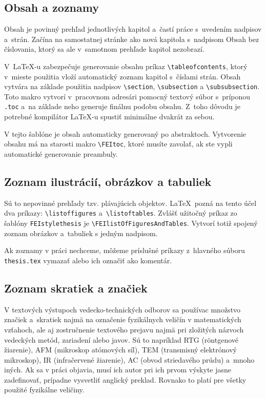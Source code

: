 \subsection{Obsah a zoznamy}
Obsah je povinný prehľad jednotlivých kapitol
a~častí práce s~uvedením nadpisov a~strán.
Začína na samostatnej stránke ako nová kapitola
s~nadpisom Obsah bez číslovania,
ktorý sa ale v~samotnom prehľade kapitol nezobrazí.

V~\LaTeX-u zabezpečuje generovanie obsahu príkaz \verb|\tableofcontents|,
ktorý v~mieste použitia vloží automatický zoznam kapitol s~číslami strán.
Obsah vytvára na základe použitia nadpisov \verb|\section|,
\verb|\subsection| a \verb|\subsubsection|.
Toto makro vytvorí v~pracovnom adresári pomocný textový súbor
s~príponou \verb|.toc| a~na základe neho generuje finálnu podobu obsahu.
Z~toho dôvodu je potrebné kompilátor \LaTeX-u
spustiť minimálne dvakrát za sebou.

V tejto šablóne je obsah automaticky generovaný po abstraktoch. Vytvorenie
obsahu má na starosti makro \verb|\FEItoc|, ktoré musíte zavolať, ak ste vypli
automatické generovanie preambuly.

\subsection*{\normalsize Zoznam ilustrácií,
obrázkov a tabuliek}
Sú to nepovinné prehľady tzv. plávajúcich objektov.
\LaTeX\ pozná na tento účel dva príkazy: \verb|\listoffigures| a~\verb|\listoftables|.
Zvlášť užitočný príkaz zo šablóny \verb|FEIstylethesis| je \verb|\FEIlistOfFiguresAndTables|.
Vytvorí totiž spojený zoznam ob\-ráz\-kov a~tabuliek s jedným nadpisom.

Ak zoznamy v práci nechceme, môžeme príslušné príkazy z~hlavného súboru \verb|thesis.tex| vymazať alebo ich označiť ako komentár.

\subsection*{\normalsize Zoznam skratiek a značiek}
V textových výstupoch vedecko-technických odborov sa používac
množstvo značiek a~skratiek najmä na označenie fyzikálnych
veličín v matematických vzťahoch,
ale aj zostručnenie textového prejavu najmä pri zložitých názvoch
vedeckých metód, zariadení alebo javov.
Sú to napríklad RTG (röntgenové žiarenie),
AFM (mikroskop atómových síl),
TEM (transmisný elektrónový mikroskop),
IR (infračervené žiarenie),
AC (obvod striedavého prúdu) a~mnoho iných.
Ak sa v práci objavia, musí ich autor pri ich prvom výskyte
jasne zadefinovať,
prípadne vysvetliť anglický preklad.
Rovnako to platí pre všetky použité fyzikálne veličiny.

